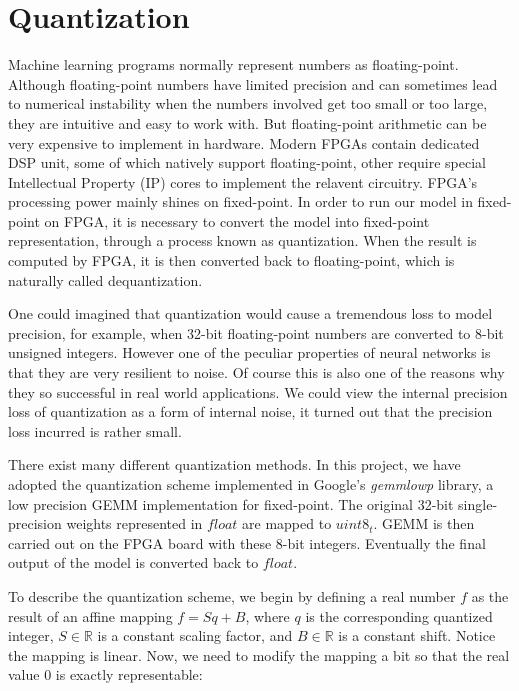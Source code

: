 
\chapter{Quantization}

Machine learning programs normally represent numbers as floating-point. Although floating-point numbers
have limited precision and can sometimes lead to numerical instability when the numbers involved get too
small or too large, they are intuitive and easy to work with. But floating-point arithmetic can be very
expensive to implement in hardware. Modern FPGAs contain dedicated DSP unit, some of which natively
support floating-point, other require special Intellectual Property (IP) cores to implement the relavent
circuitry. FPGA's processing power mainly shines on fixed-point. In order to run our model in fixed-point
on FPGA, it is necessary to convert the model into fixed-point representation, through a process known as
quantization. When the result is computed by FPGA, it is then converted back to floating-point, which is
naturally called dequantization.

One could imagined that quantization would cause a tremendous loss to model precision, for example, when
32-bit floating-point numbers are converted to 8-bit unsigned integers. However one of the peculiar
properties of neural networks is that they are very resilient to noise. Of course this is also one of the
reasons why they so successful in real world applications. We could view the internal precision loss of
quantization as a form of internal noise, it turned out that the precision loss incurred is rather small.

There exist many different quantization methods. In this project, we have adopted the quantization scheme
implemented in Google's \textit{gemmlowp} library, a low precision GEMM implementation for fixed-point. The
original 32-bit single-precision weights represented in $float$ are mapped to $uint8_t$. GEMM is then
carried out on the FPGA board with these 8-bit integers. Eventually the final output of the model is
converted back to $float$.

To describe the quantization scheme, we begin by defining a real number $f$ as the result of an affine
mapping $f = S q + B$, where $q$ is the corresponding quantized integer, $S \in \mathbb{R}$ is a constant
scaling factor, and $B \in \mathbb{R}$ is a constant shift. Notice the mapping is linear. Now, we need to
modify the mapping a bit so that the real value $0$ is exactly representable:

